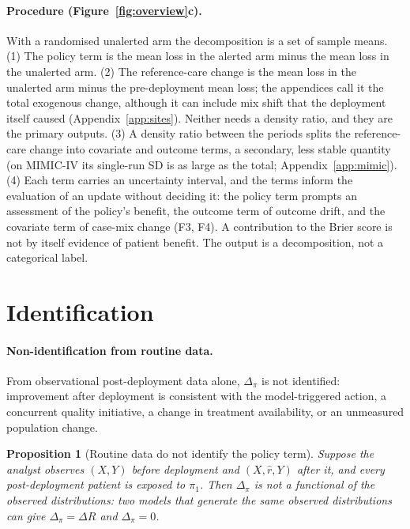 \documentclass[letterpaper]{article} %
\newtheorem{proposition}{Proposition}
\newcommand{\rhat}{\hat r}
\begin{document}
\paragraph{Procedure (Figure~\ref{fig:overview}c).} With a randomised
unalerted arm the decomposition is a set of sample means. (1) The policy term
is the mean loss in the alerted arm minus the mean loss in the unalerted arm.
(2) The reference-care change is the mean loss in the unalerted arm minus the
pre-deployment mean loss; the appendices call it the total exogenous change,
although it can include mix shift that the deployment itself caused
(Appendix~\ref{app:sites}). Neither needs a density ratio, and they are the
primary outputs. (3) A density ratio between the periods splits the
reference-care change into covariate and outcome terms, a secondary, less
stable quantity
(on MIMIC-IV its single-run SD is as large as the total;
Appendix~\ref{app:mimic}). (4) Each term carries an uncertainty interval, and
the terms inform the evaluation of an update without deciding it: the policy
term prompts an assessment of the policy's benefit, the outcome term of
outcome drift, and the covariate term of case-mix change (F3, F4). A
contribution to the Brier score is not by itself evidence of patient benefit.
The output is a decomposition, not a categorical label.

\section{Identification}
\label{sec:ident}

\paragraph{Non-identification from routine data.} From observational
post-deployment data alone, $\Delta_\pi$ is not identified: improvement after
deployment is consistent with the model-triggered action, a concurrent quality
initiative, a change in treatment availability, or an unmeasured population
change.

\begin{proposition}[Routine data do not identify the policy term]
\label{prop:nonid}
Suppose the analyst observes $(X, Y)$ before deployment and $(X, \rhat, Y)$
after it, and every post-deployment patient is exposed to $\pi_1$. Then
$\Delta_\pi$ is not a functional of the observed distributions: two models
that generate the same observed distributions can give
$\Delta_\pi = \Delta R$ and $\Delta_\pi = 0$.
\end{proposition}
\end{document}

